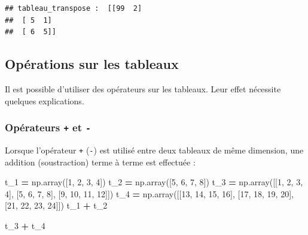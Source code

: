 \documentclass[12pt,]{book}
\newenvironment{Shaded}{\begin{snugshade}}{\end{snugshade}}
\newcommand{\DecValTok}[1]{\textcolor[rgb]{0.00,0.00,0.81}{#1}}
\newcommand{\OperatorTok}[1]{\textcolor[rgb]{0.81,0.36,0.00}{\textbf{#1}}}
\newcommand{\NormalTok}[1]{#1}
\numberwithin{equation}{section}
\numberwithin{countremarque}{section}
\begin{document}
\begin{lstlisting}
## tableau_transpose :  [[99  2]
##  [ 5  1]
##  [ 6  5]]
\end{lstlisting}

\subsection{Opérations sur les tableaux}\label{operations-tableaux}

Il est possible d'utiliser des opérateurs sur les tableaux. Leur effet
nécessite quelques explications.

\subsubsection{\texorpdfstring{Opérateurs \texttt{+} et
\texttt{-}}{Opérateurs + et -}}\label{operateurs-et--}

Lorsque l'opérateur \texttt{+} (\texttt{-}) est utilisé entre deux
tableaux de même dimension, une addition (soustraction) terme à terme
est effectuée :

\begin{Shaded}
\begin{Highlighting}[]
\NormalTok{t_1 }\OperatorTok{=}\NormalTok{ np.array([}\DecValTok{1}\NormalTok{, }\DecValTok{2}\NormalTok{, }\DecValTok{3}\NormalTok{, }\DecValTok{4}\NormalTok{])}
\NormalTok{t_2 }\OperatorTok{=}\NormalTok{ np.array([}\DecValTok{5}\NormalTok{, }\DecValTok{6}\NormalTok{, }\DecValTok{7}\NormalTok{, }\DecValTok{8}\NormalTok{])}
\NormalTok{t_3 }\OperatorTok{=}\NormalTok{ np.array([[}\DecValTok{1}\NormalTok{, }\DecValTok{2}\NormalTok{, }\DecValTok{3}\NormalTok{, }\DecValTok{4}\NormalTok{], [}\DecValTok{5}\NormalTok{, }\DecValTok{6}\NormalTok{, }\DecValTok{7}\NormalTok{, }\DecValTok{8}\NormalTok{], [}\DecValTok{9}\NormalTok{, }\DecValTok{10}\NormalTok{, }\DecValTok{11}\NormalTok{, }\DecValTok{12}\NormalTok{]])}
\NormalTok{t_4 }\OperatorTok{=}\NormalTok{ np.array([[}\DecValTok{13}\NormalTok{, }\DecValTok{14}\NormalTok{, }\DecValTok{15}\NormalTok{, }\DecValTok{16}\NormalTok{], [}\DecValTok{17}\NormalTok{, }\DecValTok{18}\NormalTok{, }\DecValTok{19}\NormalTok{, }\DecValTok{20}\NormalTok{], [}\DecValTok{21}\NormalTok{, }\DecValTok{22}\NormalTok{, }\DecValTok{23}\NormalTok{, }\DecValTok{24}\NormalTok{]])}
\NormalTok{t_1 }\OperatorTok{+}\NormalTok{ t_2}
\end{Highlighting}
\end{Shaded}

\begin{Shaded}
\begin{Highlighting}[]
\NormalTok{t_3 }\OperatorTok{+}\NormalTok{ t_4}
\end{Highlighting}
\end{Shaded}
\end{document}
